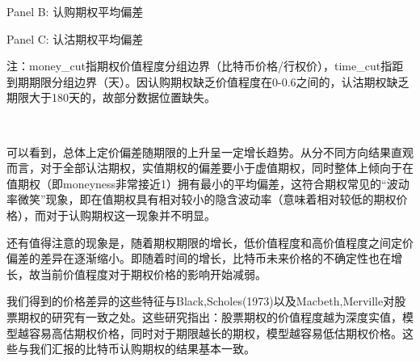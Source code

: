 {\begin{center}
\begin{threeparttable}[HT]
\begin{small}

\bigskip

\caption*{Panel B: 认购期权平均偏差}
\bigskip

\caption*{Panel C: 认沽期权平均偏差}
\begin{tablenotes}
\footnotesize
\item 注：money\_cut指期权价值程度分组边界（比特币价格/行权价），time\_cut指距到期期限分组边界（天）。因认购期权缺乏价值程度在0-0.6之间的，认沽期权缺乏期限大于180天的，故部分数据位置缺失。
\end{tablenotes}
\end{small}
\end{threeparttable}

\end{center}
~\\
\par{可以看到，总体上定价偏差随期限的上升呈一定增长趋势。从分不同方向结果直观而言，对于全部认沽期权，实值期权的偏差要小于虚值期权，同时整体上倾向于在值期权（即moneyness非常接近1）拥有最小的平均偏差，这符合期权常见的“波动率微笑”现象，即在值期权具有相对较小的隐含波动率（意味着相对较低的期权价格），而对于认购期权这一现象并不明显。}
\par{
还有值得注意的现象是，随着期权期限的增长，低价值程度和高价值程度之间定价偏差的差异在逐渐缩小。即随着时间的增长，比特币未来价格的不确定性也在增长，故当前价值程度对于期权价格的影响开始减弱。
}
\par{
    我们得到的价格差异的这些特征与Black,Scholes(1973)以及Macbeth,Merville对股票期权的研究有一致之处\cite{10.2307/1831029}\cite{Jame-1979}。这些研究指出：股票期权的价值程度越为深度实值，模型越容易高估期权价格，同时对于期限越长的期权，模型越容易低估期权价格。这些与我们汇报的比特币认购期权的结果基本一致。
}   
}
